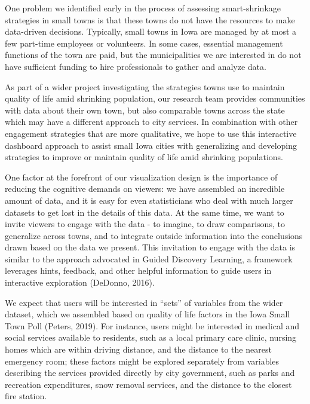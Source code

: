 \documentclass[print]{nuthesis}
\begin{document}
One problem we identified early in the process of assessing smart-shrinkage strategies in small towns is that these towns do not have the resources to make data-driven decisions. Typically, small towns in Iowa are managed by at most a few part-time employees or volunteers. In some cases, essential management functions of the town are paid, but the municipalities we are interested in do not have sufficient funding to hire professionals to gather and analyze data.

As part of a wider project investigating the strategies towns use to maintain quality of life amid shrinking population, our research team provides communities with data about their own town, but also comparable towns across the state which may have a different approach to city services. In combination with other engagement strategies that are more qualitative, we hope to use this interactive dashboard approach to assist small Iowa cities with generalizing and developing strategies to improve or maintain quality of life amid shrinking populations.

One factor at the forefront of our visualization design is the importance of reducing the cognitive demands on viewers: we have assembled an incredible amount of data, and it is easy for even statisticians who deal with much larger datasets to get lost in the details of this data. At the same time, we want to invite viewers to engage with the data - to imagine, to draw comparisons, to generalize across towns, and to integrate outside information into the conclusions drawn based on the data we present.
This invitation to engage with the data is similar to the approach advocated in Guided Discovery Learning, a framework leverages hints, feedback, and other helpful information to guide users in interactive exploration (DeDonno, 2016).

We expect that users will be interested in ``sets'' of variables from the wider dataset, which we assembled based on quality of life factors in the Iowa Small Town Poll (Peters, 2019). For instance, users might be interested in medical and social services available to residents, such as a local primary care clinic, nursing homes which are within driving distance, and the distance to the nearest emergency room; these factors might be explored separately from variables describing the services provided directly by city government, such as parks and recreation expenditures, snow removal services, and the distance to the closest fire station.
\end{document}
